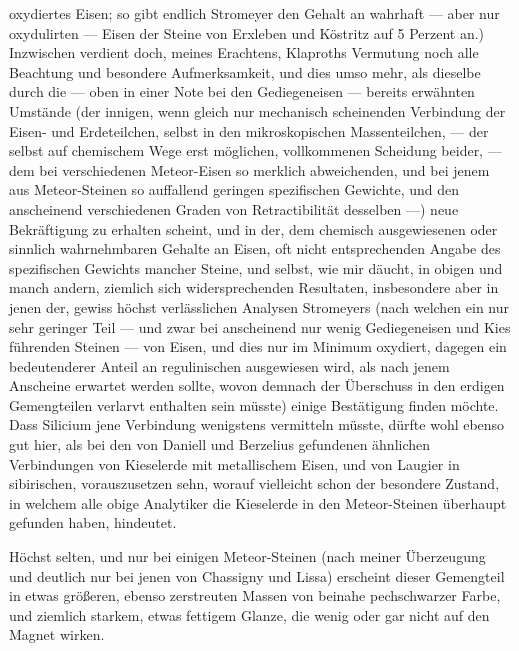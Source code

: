 \documentclass[a4paper, 11pt, oneside, german]{article}
\begin{document}
oxydiertes Eisen; so gibt endlich Stromeyer den Gehalt an wahrhaft --- aber nur oxydulirten --- Eisen der Steine von Erxleben und Köstritz auf 5 Perzent an.) Inzwischen verdient doch, meines Erachtens, Klaproths Vermutung noch alle Beachtung und besondere Aufmerksamkeit, und dies umso mehr, als dieselbe durch die --- oben in einer Note bei den Gediegeneisen --- bereits erwähnten Umstände (der innigen, wenn gleich nur mechanisch scheinenden Verbindung der Eisen- und Erdeteilchen, selbst in den mikroskopischen Massenteilchen, --- der selbst auf chemischem Wege erst möglichen, vollkommenen Scheidung beider, --- dem bei verschiedenen Meteor-Eisen so merklich abweichenden, und bei jenem aus Meteor-Steinen so auffallend geringen spezifischen Gewichte, und den anscheinend verschiedenen Graden von Retractibilität desselben ---) neue Bekräftigung zu erhalten scheint, und in der, dem chemisch ausgewiesenen oder sinnlich wahrnehmbaren Gehalte an Eisen, oft nicht entsprechenden Angabe des spezifischen Gewichts mancher Steine, und selbst, wie mir däucht, in obigen und manch andern, ziemlich sich widersprechenden Resultaten, insbesondere aber in jenen der, gewiss höchst verlässlichen Analysen Stromeyers (nach welchen ein nur sehr geringer Teil --- und zwar bei anscheinend nur wenig Gediegeneisen und Kies führenden Steinen --- von Eisen, und dies nur im Minimum oxydiert, dagegen ein bedeutenderer Anteil an regulinischen ausgewiesen wird, als nach jenem Anscheine erwartet werden sollte, wovon demnach der Überschuss in den erdigen Gemengteilen verlarvt enthalten sein müsste) einige Bestätigung finden möchte. Dass Silicium jene Verbindung wenigstens vermitteln müsste, dürfte wohl ebenso gut hier, als bei den von Daniell und Berzelius gefundenen ähnlichen Verbindungen von Kieselerde mit metallischem Eisen, und von Laugier in sibirischen, vorauszusetzen sehn, worauf vielleicht schon der besondere Zustand, in welchem alle obige Analytiker die Kieselerde in den Meteor-Steinen überhaupt gefunden haben, hindeutet.

Höchst selten, und nur bei einigen Meteor-Steinen (nach meiner Überzeugung und deutlich nur bei jenen von Chassigny und Lissa) erscheint dieser Gemengteil in etwas größeren, ebenso zerstreuten Massen von beinahe pechschwarzer Farbe, und ziemlich starkem, etwas fettigem Glanze, die wenig oder gar nicht auf den Magnet wirken.
\end{document}
